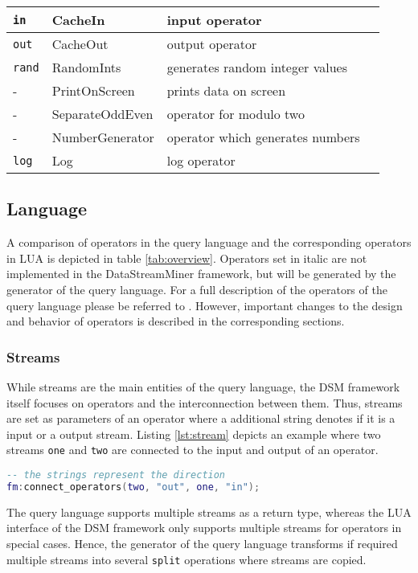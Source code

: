 \begin{center}
\begin{tabular}{|l|l|l|l|}
  \hline 
  \texttt{in} & CacheIn & input operator \\
  \hline
  \texttt{out} & CacheOut & output operator \\
  \hline
  \texttt{rand} & RandomInts & generates random integer values \\
  \hline
  - & PrintOnScreen & prints data on screen \\
  \hline  
  - & SeparateOddEven & operator for modulo two \\
  \hline  
  - & NumberGenerator & operator which generates numbers \\
  \hline  
  \texttt{log} & Log & log operator \\
  \hline
  \end{tabular}
  \label{tab:overview}
\end{center}

\subsection{Language}
A comparison of operators in the query language and the corresponding operators 
in LUA is depicted in table \ref{tab:overview}. Operators set in italic are not 
implemented in the DataStreamMiner framework, but will be generated by the 
generator of the query language. For a full description of the operators of the
query language please be referred to \cite{297:Frey2010}. However, important 
changes to the design and behavior of operators is described in the 
corresponding sections.

\subsubsection{Streams}
While streams are the main entities of the query language, the DSM framework 
itself focuses on operators and the interconnection between them. Thus, streams
are set as parameters of an operator where a additional string denotes if it is 
a input or a output stream. Listing \ref{lst:stream} depicts an example where 
two streams \texttt{one} and \texttt{two} are connected to the input and output 
of an operator.
\begin{lstlisting}[language=Lua, caption={\emph{Example of Streams in LUA}},label={lst:stream}]
-- the strings represent the direction
fm:connect_operators(two, "out", one, "in");
\end{lstlisting}
The query language supports multiple streams as a return type, whereas the LUA
interface of the DSM framework only supports multiple streams for operators in
special cases. Hence, the generator of the query language transforms if required
multiple streams into several \texttt{split} operations where streams are 
copied.

